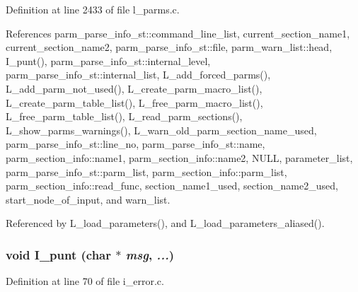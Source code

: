 Definition at line 2433 of file l\_\-parms.c.

References parm\_\-parse\_\-info\_\-st::command\_\-line\_\-list, current\_\-section\_\-name1, current\_\-section\_\-name2, parm\_\-parse\_\-info\_\-st::file, parm\_\-warn\_\-list::head, I\_\-punt(), parm\_\-parse\_\-info\_\-st::internal\_\-level, parm\_\-parse\_\-info\_\-st::internal\_\-list, L\_\-add\_\-forced\_\-parms(), L\_\-add\_\-parm\_\-not\_\-used(), L\_\-create\_\-parm\_\-macro\_\-list(), L\_\-create\_\-parm\_\-table\_\-list(), L\_\-free\_\-parm\_\-macro\_\-list(), L\_\-free\_\-parm\_\-table\_\-list(), L\_\-read\_\-parm\_\-sections(), L\_\-show\_\-parms\_\-warnings(), L\_\-warn\_\-old\_\-parm\_\-section\_\-name\_\-used, parm\_\-parse\_\-info\_\-st::line\_\-no, parm\_\-parse\_\-info\_\-st::name, parm\_\-section\_\-info::name1, parm\_\-section\_\-info::name2, NULL, parameter\_\-list, parm\_\-parse\_\-info\_\-st::parm\_\-list, parm\_\-section\_\-info::parm\_\-list, parm\_\-section\_\-info::read\_\-func, section\_\-name1\_\-used, section\_\-name2\_\-used, start\_\-node\_\-of\_\-input, and warn\_\-list.

Referenced by L\_\-load\_\-parameters(), and L\_\-load\_\-parameters\_\-aliased().
\subsubsection{\setlength{\rightskip}{0pt plus 5cm}void I\_\-punt (char $\ast$ {\em msg},  {\em ...})}\label{l__parms_8c_5ec5a66d831525f9fc1286cff963e964}




Definition at line 70 of file i\_\-error.c.

